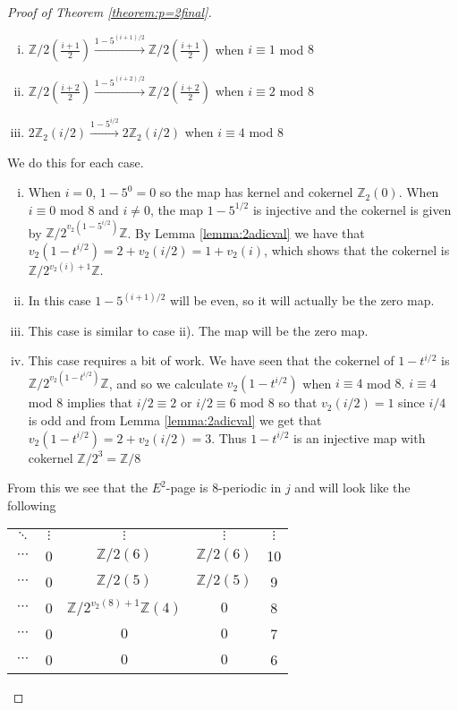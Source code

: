 \documentclass[a4paper]{article} %
\theoremstyle{definition}
\newcommand{\toWithMapLong}[1]{\overset{#1}{\longrightarrow}}
\newcommand{\Z}{\mathbb{Z}}
\begin{document}
\begin{proof}[Proof of Theorem \ref{theorem:p=2final}]
\begin{enumerate}[i)]
    \item $\Z/2(\frac{i+1}{2}) \toWithMapLong{1-5^{(i+1)/2}} \Z/2(\frac{i+1}{2})$ when $i \equiv 1$ mod $8$
    \item $\Z/2(\frac{i+2}{2}) \toWithMapLong{1-5^{(i+2)/2}} \Z/2(\frac{i+2}{2})$ when $i \equiv 2$ mod $8$
    \item $2\Z_2(i/2) \toWithMapLong{1-5^{i/2}} 2\Z_2(i/2)$ when $i \equiv 4$ mod $8$
  \end{enumerate}
  We do this for each case.
  \begin{enumerate}[i)]
    \item When $i=0$, $1-5^0 = 0$ so the map has kernel and cokernel $\Z_2(0)$. When $i \equiv 0$ mod $8$ and $i \neq 0$, the map $1-5^{1/2}$ is injective and the cokernel is given by $\Z/2^{v_2(1-5^{i/2})}\Z$. By Lemma \ref{lemma:2adicval} we have that $v_2(1-t^{i/2}) = 2 + v_2(i/2) = 1 + v_2(i)$,
    which shows that the cokernel is $\Z/2^{v_2(i)+1}\Z$.
    \item In this case $1-5^{(i+1)/2}$ will be even, so it will actually be the zero map.
    \item This case is similar to case ii). The map will be the zero map.
    \item This case requires a bit of work. We have seen that the cokernel of $1-t^{i/2}$ is $\Z/2^{v_2(1-t^{i/2})}\Z$, and so we calculate $v_2({1-t^{i/2}})$ when $i \equiv 4$ mod $8$. $i \equiv 4$ mod $8$ implies that $i/2 \equiv 2$ or $i/2 \equiv 6$ mod $8$ so that $v_2(i/2) = 1$ since $i/4$ is odd
    and from Lemma \ref{lemma:2adicval} we get that $v_2(1-t^{i/2}) = 2 + v_2(i/2) = 3$. Thus $1-t^{i/2}$ is an injective map with cokernel $\Z/2^3 = \Z/8$
  \end{enumerate}
  From this we see that the $E^2$-page is $8$-periodic in $j$ and will look like the following
  \begin{table}[H]
    \centering
    \setlength{\tabcolsep}{12pt}
    \setlength{\extrarowheight}{2pt}
  \begin{tabular}{cccc|c}
    $\ddots$        &   $\vdots$ &  $\vdots$  & $\vdots$  & $\vdots$ \\
    $\cdots$        &   0 &  $\Z/2(6)$  & $\Z/2(6)$  & 10 \\
    $\cdots$        &   0 &  $\Z/2(5)$  & $\Z/2(5)$  & 9 \\
    $\cdots$        &   0 &  $\Z/2^{v_2(8)+1}\Z(4)$  & $0$  & 8 \\
    $\cdots$        &   0 &  $0$  & $0$  & 7 \\
    $\cdots$        &   0 &  $0$  & $0$  & 6 \\

\end{tabular}
\end{table}
\end{proof}
\end{document}
